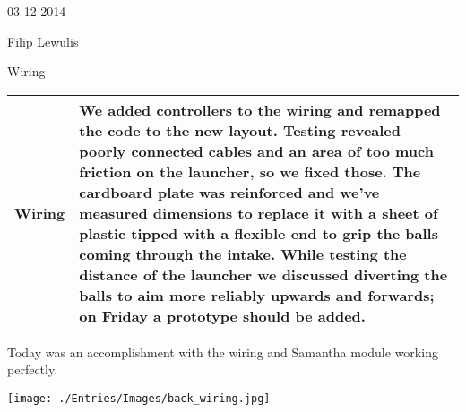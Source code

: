 03-12-2014

Filip Lewulis

Wiring

\begin{tabular}{|p{5cm}|p{5cm}|}
\hline Wiring &
We added controllers to the wiring and remapped the code to the new layout.
Testing revealed poorly connected cables and an area of too much friction 
on the launcher, so we fixed those. The cardboard plate was reinforced and
we've measured dimensions to replace it with a sheet of plastic tipped with
a flexible end to grip the balls coming through the intake. While testing
the distance of the launcher we discussed diverting the balls to aim more
reliably upwards and forwards; on Friday a prototype should be added. \\
\hline
\end{tabular}
Today was an accomplishment with the wiring and Samantha module working perfectly.

\texttt{[image: ./Entries/Images/back\_wiring.jpg]}